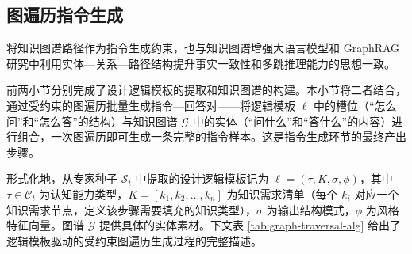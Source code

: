 \documentclass[fontset=fandol,type=master,campus=shenzhen,etitleauto=true]{hithesisbook}
\begin{document}
\subsection{图遍历指令生成}\label{ux903bux8f91ux6a21ux677fux9a71ux52a8ux7684ux56feux904dux5386ux751fux6210}

将知识图谱路径作为指令生成约束，也与知识图谱增强大语言模型和 GraphRAG 研究中利用实体—关系—路径结构提升事实一致性和多跳推理能力的思想一致\cite{ref15,ref16}。

前两小节分别完成了设计逻辑模板的提取和知识图谱的构建。本小节将二者结合，通过受约束的图遍历批量生成指令---回答对——将逻辑模板 $\ell$ 中的槽位（``怎么问''和``怎么答''的结构）与知识图谱 $\mathcal{G}$ 中的实体（``问什么''和``答什么''的内容）进行组合，一次图遍历即可生成一条完整的指令样本。这是指令生成环节的最终产出步骤。

形式化地，从专家种子 $\mathcal{S}_t$ 中提取的设计逻辑模板记为 $\ell = (\tau, K, \sigma, \phi)$，其中 $\tau \in \mathcal{C}_t$ 为认知能力类型，$K = [k_1, k_2, \ldots, k_n]$ 为知识需求清单（每个 $k_i$ 对应一个知识需求节点，定义该步骤需要填充的知识类型），$\sigma$ 为输出结构模式，$\phi$ 为风格特征向量。图谱 $\mathcal{G}$ 提供具体的实体素材。下文表 \ref{tab:graph-traversal-alg} 给出了逻辑模板驱动的受约束图遍历生成过程的完整描述。
\end{document}
